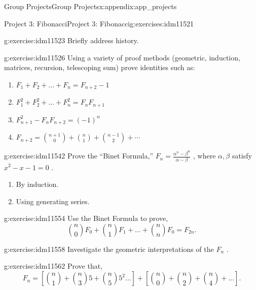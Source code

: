 \documentclass[oneside,10pt,]{book}
\numberwithin{equation}{chapter}
\begin{document}
\begin{appendixptx}{Group Projects}{}{Group Projects}{}{}{x:appendix:app_projects}
%
\begin{exercises-section-numberless}{Project 3: Fibonacci}{}{Project 3: Fibonacci}{}{}{g:exercises:idm11521}
\begin{divisionexercise}{1}{}{}{g:exercise:idm11523}%
Briefly address history.%
\end{divisionexercise}%
\begin{divisionexercise}{2}{}{}{g:exercise:idm11526}%
Using a variety of proof methods (geometric, induction, matrices, recursion, telescoping sum) prove identities such as:%
\begin{enumerate}[label=(\alph*)]
\item{}\(F_{1} + F_{2} + \ldots + F_{n} = F_{n + 2} - 1\)%
\item{}\(F_{1}^{2} + F_{2}^{2} + \ldots + F_{n}^{2} = F_{n}F_{n + 1}\)%
\item{}\(F_{n + 1}^{2} - F_{n}F_{n + 2} = \left( - 1 \right)^{n}\)%
\item{}\(F_{n + 2} = \binom{n + 1}{0} + \binom{n}{1} + \binom{n - 1}{2} + \cdots\)%
\end{enumerate}
%
\end{divisionexercise}%
\begin{divisionexercise}{3}{}{}{g:exercise:idm11542}%
Prove the ``Binet Formula,'' \(F_{n} = \frac{\alpha^{n} - \beta^{n}}{\alpha - \beta}\) , where \(\alpha,\beta\) satisfy \(x^{2} - x - 1 = 0\) .%
\begin{enumerate}[label=(\alph*)]
\item{}By induction.%
\item{}Using generating series.%
\end{enumerate}
%
\end{divisionexercise}%
\begin{divisionexercise}{4}{}{}{g:exercise:idm11554}%
Use the Binet Formula to prove,%
\begin{equation*}
\binom{n}{0}F_{0} + \binom{n}{1} F_{1} + \ldots + \binom{n}{n}F_{0} = F_{2n}.
\end{equation*}
%
\end{divisionexercise}%
\begin{divisionexercise}{5}{}{}{g:exercise:idm11558}%
Investigate the geometric interpretations of the \(F_{n}\) .%
\end{divisionexercise}%
\begin{divisionexercise}{6}{}{}{g:exercise:idm11562}%
Prove that,%
\begin{equation*}
F_{n} = \left\lbrack \binom{n}{1}  + \binom{n}{3} 5 + \binom{n}{5} 5^{2}\ldots \right\rbrack + \left\lbrack \binom{n}{0}  + \binom{n}{2}  + \binom{n}{4}  + \ldots \right\rbrack.

\end{equation*}
\end{divisionexercise}
\end{exercises-section-numberless}
\end{appendixptx}
\end{document}
